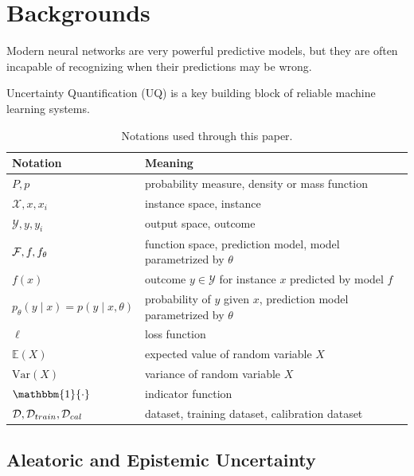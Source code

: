 \section{Backgrounds}
\label{sec:intro_background}


Modern neural networks are very powerful predictive models, but they are often incapable of recognizing when their predictions may be wrong.


Uncertainty Quantification (UQ) is a key building block of reliable machine learning systems.

\begin{table}[h]
\centering
\begin{tabular}{ll}
\hline
\textbf{Notation} & \textbf{Meaning} \\
\hline
$P, p$ & probability measure, density or mass function \\
$\mathcal{X}, x, x_i$ & instance space, instance \\
$\mathcal{Y}, y, y_i$ & output space, outcome \\
${\mathcal{F}}, f, f_\theta$ & function space, prediction model, model parametrized by $\theta$ \\
$f(x)$ & outcome $y \in \mathcal{Y}$ for instance $x$ predicted by model $f$ \\
$p_{\theta}(y \mid x) = p(y \mid x, \theta)$ & probability of  $y$ given $x$, prediction model parametrized by  $\theta$ \\
$\ell$ & loss function \\
$\mathbb{E}(X)$ & expected value of random variable $X$ \\
$\text{Var}(X)$ & variance of random variable $X$ \\
$\mathbbm{1} \{\cdot\}$ & indicator function \\
${\mathcal{D}}, \mathcal{D}_{train}, \mathcal{D}_{cal}$ & dataset, training dataset, calibration dataset \\ 
\hline
\end{tabular}
\caption{Notations used through this paper.}
\end{table}

\subsection{Aleatoric and Epistemic Uncertainty}

